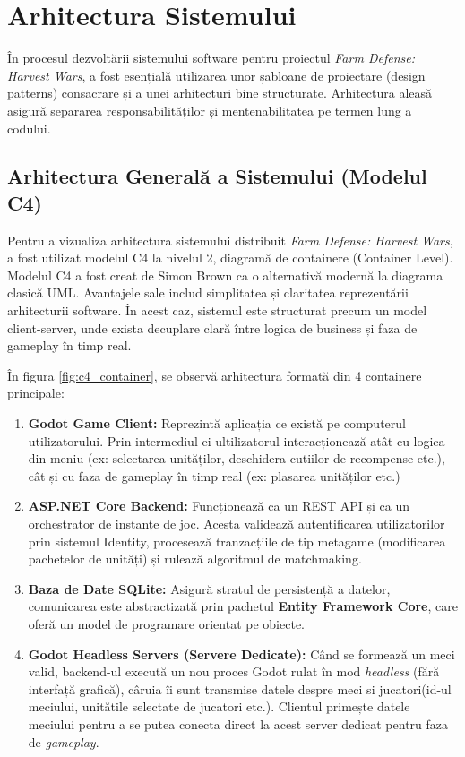 \chapter{Arhitectura Sistemului}
\label{ch:arhitectura}

În procesul dezvoltării sistemului software pentru proiectul \textit{Farm Defense: Harvest Wars}, a fost esențială utilizarea unor șabloane de proiectare (design patterns) consacrare și a
unei arhitecturi bine structurate. Arhitectura aleasă asigură separarea responsabilităților și mentenabilitatea pe termen lung a codului.

\section{Arhitectura Generală a Sistemului (Modelul C4)}
\label{sec:arhitectura_sistem}

Pentru a vizualiza arhitectura sistemului distribuit \textit{Farm Defense: Harvest Wars}, a fost utilizat modelul C4 \cite{brown_c4_model} la nivelul 2, diagramă de containere (Container Level). Modelul C4 a fost creat de Simon Brown ca o alternativă modernă la diagrama clasică UML. Avantajele sale includ simplitatea și claritatea reprezentării arhitecturii software. În acest caz, sistemul este structurat precum un model client-server, unde exista decuplare clară între logica de business și faza de gameplay în timp real.

În figura \ref{fig:c4_container}, se observă arhitectura formată din 4 containere principale:
\begin{enumerate}
    \item \textbf{Godot Game Client:} Reprezintă aplicația ce există pe computerul utilizatorului. Prin intermediul ei ultilizatorul interacționează atât cu logica din meniu (ex: selectarea unităților, deschidera cutiilor de recompense etc.), cât și cu faza de gameplay în timp real (ex: plasarea unităților etc.)
    \item \textbf{ASP.NET Core Backend:} Funcționează ca un REST API și ca un orchestrator de instanțe de joc. Acesta validează autentificarea utilizatorilor prin sistemul Identity, procesează tranzacțiile de tip metagame (modificarea pachetelor de unități) și rulează algoritmul de matchmaking.
    \item \textbf{Baza de Date SQLite:}
          Asigură stratul de persistență a datelor, comunicarea este abstractizată prin pachetul \textbf{Entity Framework Core}, care oferă un model de programare orientat pe obiecte.
    \item \textbf{Godot Headless Servers (Servere Dedicate):} Când se formează un meci valid, backend-ul execută un nou proces Godot rulat în mod \textit{headless} (fără interfață grafică), câruia îi sunt transmise datele despre meci si jucatori(id-ul meciului, unitătile selectate de jucatori etc.). Clientul primește datele meciului pentru a se putea conecta direct la acest server dedicat pentru faza de \textit{gameplay}.
\end{enumerate}

